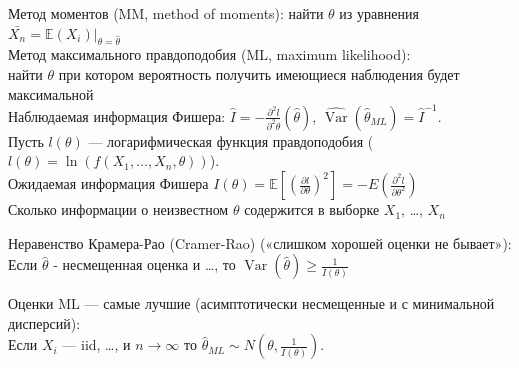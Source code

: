 \documentclass[12pt, a4paper]{article}
\DeclareMathOperator{\Var}{Var}
\newcommand{\E}{\mathbb{E}}
\renewcommand{\ge}{\geqslant}
\begin{document}
\begin{leftbar}
Метод моментов (MM, method of moments): найти $\theta$ из уравнения $\bar{X_{n}}=\E(X_{i})|_{\theta=\hat\theta}$ \\
Метод максимального правдоподобия (ML, maximum likelihood): \\
найти $\theta$ при котором вероятность получить имеющиеся наблюдения будет максимальной \\
Наблюдаемая информация Фишера: $\hat{I}=-\frac{\partial^2 l}{\partial^2 \theta}(\hat{\theta})$, $\widehat{\Var}(\hat{\theta}_{ML})=\hat{I}^{-1}$. \\


Пусть $l(\theta)$ — логарифмическая функция правдоподобия ($l(\theta)=\ln(f(X_{1}, \ldots ,X_{n},\theta))$). \\
Ожидаемая информация Фишера $I(\theta)=\E\left[\left(\frac{\partial
l}{\partial \theta}\right)^{2}\right]=-E\left(\frac{\partial^{2}l}{\partial \theta^{2}}\right)$ \\
Сколько информации о неизвестном $\theta$ содержится в выборке $X_{1}$, \ldots , $X_{n}$

Неравенство Крамера-Рао (Cramer-Rao) («слишком хорошей оценки не бывает»): \\
Если $\hat{\theta}$ - несмещенная оценка и \ldots , то
$\Var(\hat{\theta})\ge \frac{1}{I(\theta)}$

Оценки ML — самые лучшие (асимптотически несмещенные и с минимальной дисперсий): \\
Если $X_{i}$ — iid, \ldots , и $n\to\infty$ то $\hat{\theta}_{ML}\sim N(\theta,\frac{1}{I(\theta)})$.
\end{leftbar}

\end{document}
